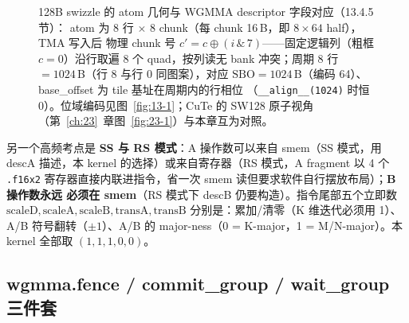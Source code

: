 \begin{figure}[H]
\caption{128B swizzle 的 atom 几何与 WGMMA descriptor 字段对应（13.4.5 节）：
atom 为 8 行 $\times$ 8 chunk（每 chunk 16\,B，即 $8\times64$ half），TMA 写入后
物理 chunk 号 $c'=c\oplus(i\,\&\,7)$——固定逻辑列（粗框 $c{=}0$）沿行取遍 8 个
quad，按列读无 bank 冲突；周期 8 行 $=1024$\,B（行 8 与行 0 同图案），对应
$\mathrm{SBO}=1024$\,B（编码 64）、base\_offset 为 tile 基址在周期内的行相位
（\texttt{\_\_align\_\_(1024)} 时恒 0）。位域编码见图~\ref{fig:13-1}；CuTe 的 SW128
原子视角（第~\ref{ch:23}~章图~\ref{fig:23-1}）与本章互为对照。}
\label{fig:13-swizzle-atom}
\end{figure}

另一个高频考点是 \textbf{SS 与 RS 模式}：A 操作数可以来自 smem（SS 模式，用 descA
描述，本 kernel 的选择）或来自寄存器（RS 模式，A fragment 以 4 个 \texttt{.f16x2}
寄存器直接内联进指令，省一次 smem 读但要求软件自行摆放布局）；\textbf{B 操作数永远
必须在 smem}（RS 模式下 descB 仍要构造）。指令尾部五个立即数
$\mathrm{scaleD}, \mathrm{scaleA}, \mathrm{scaleB}, \mathrm{transA}, \mathrm{transB}$
分别是：累加/清零（K 维迭代必须用 1）、A/B 符号翻转（$\pm 1$）、A/B 的
major-ness（0 = K-major，1 = M/N-major）。本 kernel 全部取 $(1, 1, 1, 0, 0)$。

\subsection{wgmma.fence / commit\_group / wait\_group 三件套}



